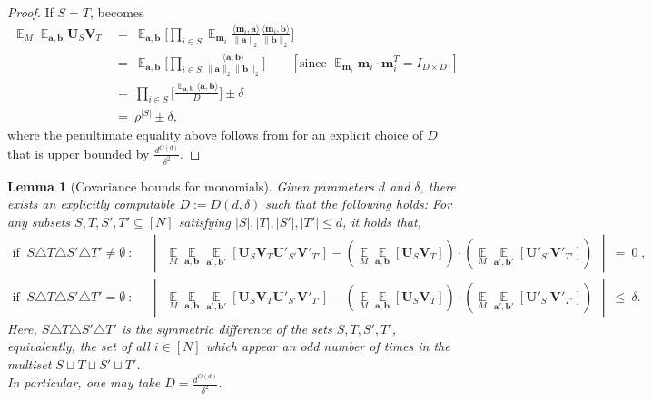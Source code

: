 \documentclass[11pt]{article}
\newcommand{\inparen}[1]{\left ( #1 \right )}
\newcommand{\insquare}[1]{\left [ #1 \right ]}
\newcommand{\inabs}[1]{\begin{vmatrix} #1 \end{vmatrix}}
\DeclareMathOperator*{\Ex}{\mathbb{E}}
\newcommand{\ba}{{\bm a}}
\newcommand{\bb}{{\bm b}}
\newcommand{\m}{{\bm m}}
\newcommand{\bU}{\mathbf{U}}
\newcommand{\bV}{\mathbf{V}}
\newtheorem{lem}[theorem]{Lemma}
\begin{document}
\begin{proof}
	\noindent If $S = T$,  becomes
	\begin{align*}
		\Ex_{M} \Ex_{\ba, \bb} \bU_S \bV_T
		&~=~ \Ex_{\ba, \bb} \bigg[ \prod_{i \in S} \Ex_{\m_i}\frac{\langle \m_i, \ba \rangle}{\|\ba\|_2} \frac{\langle \m_i , \bb \rangle}{\|\bb\|_2} \bigg]\\
		&~=~ \Ex_{\ba, \bb} \bigg[\prod_{i \in S} \frac{ \langle \ba, \bb \rangle}{\|\ba\|_2 \|\bb\|_2} \bigg] \qquad \insquare{\text{since $\Ex_{\m_i} \m_i \cdot \m_i^T = I_{D \times D}$.}}\\
		&~=~ \prod_{i \in S} \bigg[ \frac{ \Ex_{\ba, \bb}\langle \ba, \bb \rangle}{D} \bigg] \pm \delta\\
		&~=~ \rho^{|S|} \pm \delta,
	\end{align*}
	where the penultimate equality above follows from  for an explicit choice of $D$ that is upper bounded by $\frac{d^{O(d)}}{\delta^2}$.
\end{proof}

\begin{lem}[Covariance bounds for monomials]\label{lem:var_bound_monomial}
	Given parameters $d$ and $\delta$, there exists an explicitly computable $D := D(d, \delta)$ such that the following holds:
	For any subsets $S, T, S', T' \subseteq [N]$ satisfying $|S|, |T|, |S'|, |T'| \le d$, it holds that,
	\begin{align*}
		\text{if } \ S \triangle T \triangle S' \triangle T' \ne \emptyset ~:~
		& \ \inabs{\Ex\limits_{M} \Ex\limits_{\ba, \bb} \Ex\limits_{\ba', \bb'} \insquare{\bU_S \bV_T \bU'_{S'} \bV'_{T'}} - \inparen{\Ex\limits_{M} \Ex\limits_{\ba, \bb} \insquare{\bU_S \bV_T}} \cdot \inparen{\Ex\limits_{M} \Ex\limits_{\ba', \bb'} \insquare{\bU'_{S'} \bV'_{T'}}}} ~=~ 0\;,\\
		\text{if }\ S \triangle T \triangle S' \triangle T' = \emptyset ~:~
		& \ \inabs{\Ex\limits_{M} \Ex\limits_{\ba, \bb} \Ex\limits_{\ba', \bb'} \insquare{\bU_S \bV_T \bU'_{S'} \bV'_{T'}} - \inparen{\Ex\limits_{M} \Ex\limits_{\ba, \bb} \insquare{\bU_S \bV_T}} \cdot \inparen{\Ex\limits_{M} \Ex\limits_{\ba', \bb'} \insquare{\bU'_{S'} \bV'_{T'}}}} ~\le~ \delta.%
	\end{align*}
	Here, $S \triangle T \triangle S' \triangle T'$ is the symmetric difference of the sets $S, T, S', T'$, equivalently, the set of all $i \in [N]$ which appear an odd number of times in the multiset $S \sqcup T \sqcup S' \sqcup T'$.\\
	In particular, one may take $D = \frac{d^{O(d)}}{\delta^2}$.
\end{lem}
\end{document}
